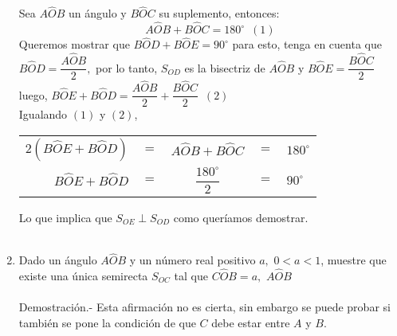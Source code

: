 \begin{enumerate}
\begin{center}
\begin{tikzpicture}
	    \end{tikzpicture}
	\end{center}
	Sea $A\widehat{O}B$ un ángulo y $B\widehat{O}C$ su suplemento, entonces: $$A\widehat{O}B + B\widehat{O}C = 180^{\circ}\,\,\, (1)$$ Queremos mostrar que $B\widehat{O}D + B\widehat{O}E = 90^{\circ}$ para esto, tenga en cuenta que $B\widehat{O}D = \dfrac{A\widehat{O}B}{2},$ por lo tanto, $S_{OD}$ es la bisectriz de $A\widehat{O}B$ y $B\widehat{O}E = \dfrac{B\widehat{O}C}{2}$ luego, $B\widehat{O}E + B\widehat{O}D = \dfrac{A\widehat{O}B}{2} + \dfrac{B\widehat{O}C}{2}\,\,\, (2)$\\ 
	Igualando $(1)$ y $(2)$, 
	\begin{center}
	    \begin{tabular}{rcccl}
		$2(B\widehat{O}E + B\widehat{O}D)$ & $=$ & $A\widehat{O}B + B\widehat{O}C$ & $=$ & $180^{\circ}$\\
		$B\widehat{O}E + B\widehat{O}D$ & $=$ & $\dfrac{180^{\circ}}{2}$ & $=$ & $90^{\circ}$\\ 
	    \end{tabular}
	\end{center}

	Lo que implica que $S_{OE} \perp S_{OD}$ como queríamos demostrar.\\\\

	\item Dado un ángulo $A\widehat{O}B$ y un número real positivo $a,$ $0<a<1$, muestre que existe una única semirecta $S_{OC}$ tal que $C \widehat{O}B=a,$ $A \widehat{O} B$\\\\
	Demostración.-\; Esta afirmación no es cierta, sin embargo se puede probar si también se pone la condición de que $C$ debe estar entre $A$ y $B$.\\\\


\end{enumerate}
